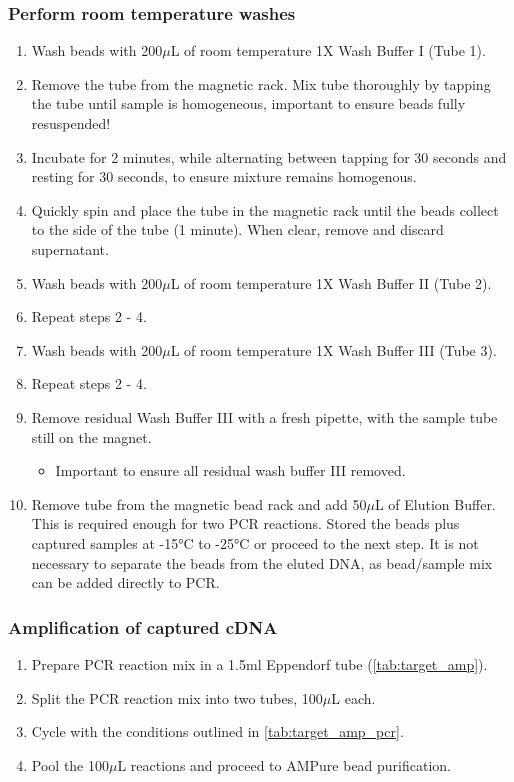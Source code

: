 \subsubsection{Perform room temperature washes}
\label{rmtempwashes}
\begin{enumerate}
	\item Wash beads with 200$\mu$L of room temperature 1X Wash Buffer I (Tube 1). 
	\item Remove the tube from the magnetic rack. Mix tube thoroughly by tapping the tube until sample is homogeneous, important to ensure beads fully resuspended! 
	\item Incubate for 2 minutes, while alternating between tapping for 30 seconds and resting for 30 seconds, to ensure mixture remains homogenous.
	\item Quickly spin and place the tube in the magnetic rack until the beads collect to the side of the tube (1 minute). When clear, remove and discard supernatant.
	\item Wash beads with 200$\mu$L of room temperature 1X Wash Buffer II (Tube 2). 
	\item Repeat steps 2 - 4.
	\item Wash beads with 200$\mu$L of room temperature 1X Wash Buffer III (Tube 3). 
	\item Repeat steps 2 - 4.
	\item Remove residual Wash Buffer III with a fresh pipette, with the sample tube still on the magnet.
	\begin{itemize}	
		\item Important to ensure all residual wash buffer III removed. 
	\end{itemize}  
	\item Remove tube from the magnetic bead rack and add 50$\mu$L of Elution Buffer.
	This is required enough for two PCR reactions. Stored the beads plus captured samples at -15°C to -25°C or proceed to the next step. It is not necessary to separate the beads from the eluted DNA, as bead/sample mix can be added directly to PCR.
\end{enumerate}

\subsubsection{Amplification of captured cDNA}
\begin{enumerate}
	\item Prepare PCR reaction mix in a 1.5ml Eppendorf tube (\cref{tab:target_amp}).
	\item Split the PCR reaction mix into two tubes, 100$\mu$L each. 
	\item Cycle with the conditions outlined in \cref{tab:target_amp_pcr}.
	\item Pool the 100$\mu$L reactions and proceed to AMPure bead purification.
\end{enumerate}

